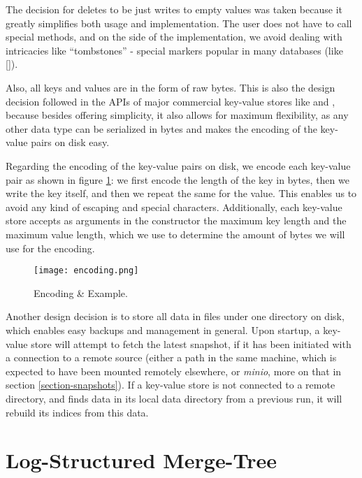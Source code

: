 The decision for deletes to be just writes to empty values was taken because it greatly simplifies both usage and implementation. The user does not have to call special methods, and on the side of the implementation, we avoid dealing with intricacies like ``tombstones'' - special markers popular in many databases (like [\cite{myrocks}]).

Also, all keys and values are in the form of raw bytes.
This is also the design decision followed in the APIs of major commercial key-value stores like \cite{rocksdb} and \cite{redis}, because besides offering simplicity, it also allows for maximum flexibility, as any other data type can be serialized in bytes and makes the encoding of the key-value pairs on disk easy.

Regarding the encoding of the key-value pairs on disk, we encode each key-value pair as shown in figure \ref{fig:encoding}: we first encode the length of the key in bytes, then we write the key itself, and then we repeat the same for the value. This enables us to avoid any kind of escaping and special characters. Additionally, each key-value store accepts as arguments in the constructor the maximum key length and the maximum value length, which we use to determine the amount of bytes we will use for the encoding.

\begin{figure}[h]
    \centering
    \texttt{[image: encoding.png]}
    \caption{Encoding \& Example.}
    \label{fig:encoding}
\end{figure}

Another design decision is to store all data in files under one directory on disk, which enables easy backups and management in general. Upon startup, a key-value store will attempt to fetch the latest snapshot, if it has been initiated with a connection to a remote source (either a path in the same machine, which is expected to have been mounted remotely elsewhere, or \textit{minio}, more on that in section \ref{section-snapshots}). If a key-value store is not connected to a remote directory, and finds data in its local data directory from a previous run, it will rebuild its indices from this data.


\section{Log-Structured Merge-Tree}

